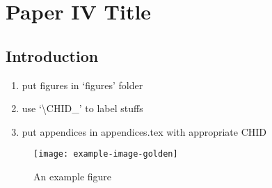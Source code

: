 \chapter{Paper IV Title}\label{ch:\CHID}

	

\section{Introduction} \label{\CHID_sec:intro}
	\begin{enumerate}
		\item put figures in `figures' folder
		\item use `\textbackslash CHID\_' to label stuffs
		\item put appendices in appendices.tex with appropriate CHID
	\end{enumerate}
	\begin{figure}[h]
		\centering
		\texttt{[image: example-image-golden]}
		\caption{An example figure}\label{\CHID_fig:exmple_image}
	\end{figure}